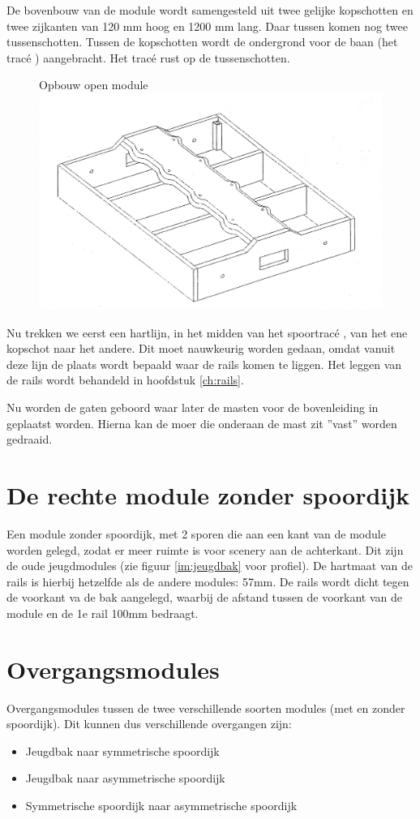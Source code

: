 \documentclass[12pt,a4paper]{report}
\newcommand*{\trace}{trac\'{e} }
\begin{document}
De bovenbouw van de module wordt samengesteld uit twee gelijke kopschotten en twee zijkanten van 120 mm hoog en 1200 mm lang. Daar tussen komen nog twee tussenschotten.
Tussen de kopschotten wordt de ondergrond voor de baan (het \trace) aangebracht. Het \trace rust op de tussenschotten. 

\begin{figure}[ht]
  \captionbox
  {Opbouw open module\label{figuur1}}
  {\includegraphics[scale=0.2]{images/rcu_figuur1}}
\end{figure}

Nu trekken we eerst een hartlijn, in het midden van het spoor\trace, van het ene kopschot naar het andere. Dit moet nauwkeurig worden gedaan, omdat vanuit deze lijn de plaats wordt bepaald waar de rails komen te liggen.
Het leggen van de rails wordt behandeld in hoofdstuk \ref{ch:rails}.

Nu worden de gaten geboord waar later de masten voor de bovenleiding in geplaatst worden. 
Hierna kan de moer die onderaan de mast zit ''vast'' worden gedraaid.

\section{De rechte module zonder spoordijk}
Een module zonder spoordijk, met 2 sporen die aan een kant van de module worden gelegd, zodat er meer ruimte is voor scenery aan de achterkant. Dit zijn de oude jeugdmodules (zie figuur \ref{im:jeugdbak} voor profiel).
De hartmaat van de rails is hierbij hetzelfde als de andere modules: 57mm. De rails wordt dicht tegen de voorkant va de bak aangelegd, waarbij de afstand tussen de voorkant van de module en de 1e rail 100mm bedraagt.

\section{Overgangsmodules}
Overgangsmodules tussen de twee verschillende soorten modules (met en zonder spoordijk). Dit kunnen dus verschillende overgangen zijn:
\begin{itemize}
\item Jeugdbak naar symmetrische spoordijk
\item Jeugdbak naar asymmetrische spoordijk
\item Symmetrische spoordijk naar asymmetrische spoordijk
\end{itemize}
\end{document}
